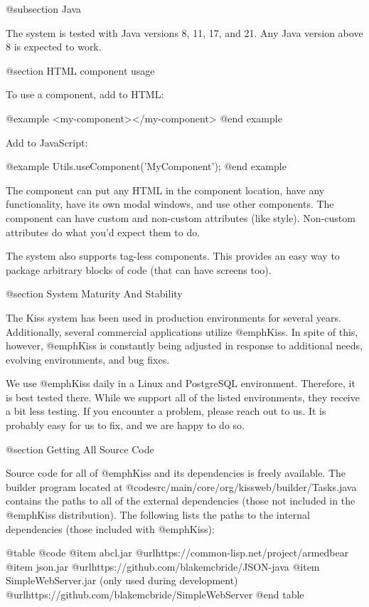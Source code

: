 @subsection Java

The system is tested with Java versions 8, 11, 17, and 21.  Any Java version above 8
is expected to work.



@section HTML component usage
   
To use a component, add to HTML:

@example
<my-component></my-component>
@end example

Add to JavaScript:

@example
Utils.useComponent('MyComponent');
@end example
    
The component can put any HTML in the component location, have any
functionality, have its own modal windows, and use other components.
The component can have custom and non-custom attributes (like style).
Non-custom attributes do what you'd expect them to do.

The system also supports tag-less components.  This provides an easy
way to package arbitrary blocks of code (that can have screens too).

@section System Maturity And Stability

The Kiss system has been used in production environments for several
years.  Additionally, several commercial applications utilize @emph{Kiss}.
In spite of this, however, @emph{Kiss} is constantly being adjusted
in response to additional needs, evolving environments, and bug fixes.

We use @emph{Kiss} daily in a Linux and PostgreSQL environment.
Therefore, it is best tested there.  While we support all of the listed
environments, they receive a bit less testing.  If you encounter a problem,
please reach out to us.  It is probably easy for us to fix, and we
are happy to do so.


@section Getting All Source Code

Source code for all of @emph{Kiss} and its dependencies is freely
available.  The builder program located at
@code{src/main/core/org/kissweb/builder/Tasks.java} contains the paths
to all of the external dependencies (those not included in the
@emph{Kiss} distribution).  The following lists the paths to the
internal dependencies (those included with @emph{Kiss}):

@table @code
@item abcl.jar
@url{https://common-lisp.net/project/armedbear}
@item json.jar
@url{https://github.com/blakemcbride/JSON-java}
@item SimpleWebServer.jar (only used during development)
@url{https://github.com/blakemcbride/SimpleWebServer}
@end table

